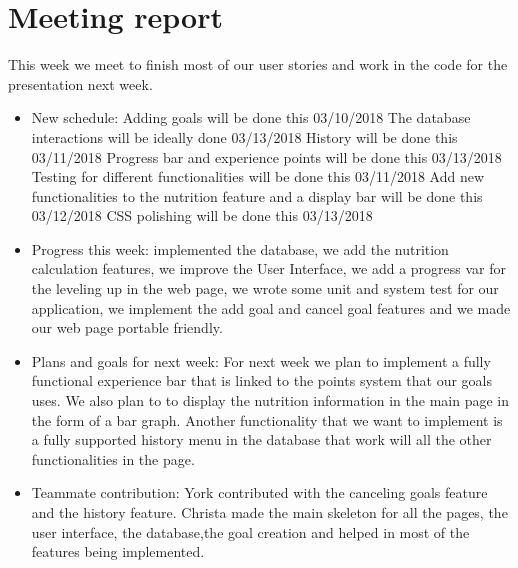 \documentclass[a4paper]{article}
\begin{document}
\section{Meeting report}
This week we meet to finish most of our user stories and work in the code for the presentation next week.
\begin{itemize}
\item New schedule: 
\newline
\newline
Adding goals will be done this 03/10/2018
\newline
The database interactions will be ideally done 03/13/2018
\newline
History will be done this 03/11/2018
\newline
Progress bar and experience points will be done this 03/13/2018
\newline
Testing for different functionalities will be done this 03/11/2018
\newline
Add new functionalities to the nutrition feature and a display bar will be done this 03/12/2018
\newline
CSS polishing will be done this 03/13/2018
\item Progress this week: 
\newline
\newline
implemented the database, we add the nutrition calculation features, we improve the User Interface, we add a progress var for the leveling up in the web page, we wrote some unit and system test for our application, we implement the add goal and cancel goal features and we made our web page portable friendly. 
\item Plans and goals for next week: 
\newline
\newline
For next week we plan to implement a fully functional experience bar that is linked to the points system that our goals uses.
We also plan to to display the nutrition information in the main page in the form of a bar graph. Another functionality that we want to implement is a fully supported history menu in the database that work will all the other functionalities in the page.
\item Teammate contribution:
\newline
\newline
York contributed with the canceling goals feature and the history feature.
\newline
\newline
Christa made the main skeleton for all the pages, the user interface, the database,the goal creation and helped in most of the features being implemented.

\end{itemize}
\end{document}
